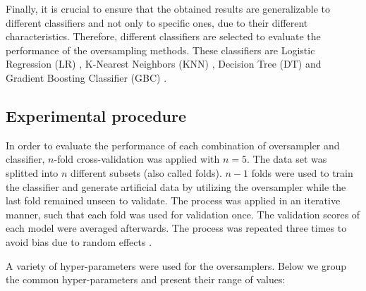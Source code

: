 \documentclass[parskip=full]{scrartcl}
\begin{document}
Finally, it is crucial to ensure that the obtained results are generalizable to different classifiers and not only to specific ones, due to their different characteristics. Therefore, different classifiers are selected to evaluate the performance of the oversampling methods. These classifiers are Logistic Regression (LR) \cite{McCullagh1989}, K-Nearest Neighbors (KNN) \cite{Cover1967}, Decision Tree (DT) \cite{Salzberg1994} and Gradient Boosting Classifier (GBC) \cite{Friedman2001}.

\subsection{Experimental procedure}

In order to evaluate the performance of each combination of oversampler and classifier, $n$-fold cross-validation was applied with $n = 5$. The data set was splitted into $n$ different subsets (also called folds). $n-1$ folds were used to train the classifier and generate artificial data by utilizing the oversampler while the last fold remained unseen to validate. The process was applied in an iterative manner, such that each fold was used for validation once. The validation scores of each model were averaged afterwards. The process was repeated three times to avoid bias due to random effects \cite{Japkowicz2013}.

A variety of hyper-parameters were used for the oversamplers. Below we group the common hyper-parameters and present their range of values:
\end{document}
